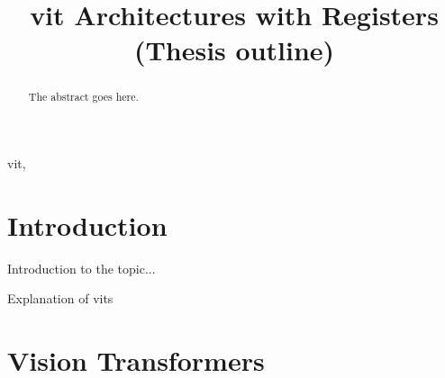 \documentclass[conference]{IEEEtran}
\begin{document}
  \title{\acl{vit} Architectures with Registers (Thesis outline)}

  \author{
    }

  \maketitle
  \begin{abstract}
  The abstract goes here.
  \end{abstract}

  \begin{IEEEkeywords}
    \ac{vit}, 
    \end{IEEEkeywords}

  \IEEEpeerreviewmaketitle

  \section{Introduction}
  Introduction to the topic...

  Explanation of \acp{vit} \cite{10.1145/3505244} \cite{visiontransformers2021} \cite{vit-state-challenges} \cite{Liu2024-lm}

  \section{Vision Transformers}

\end{document}
